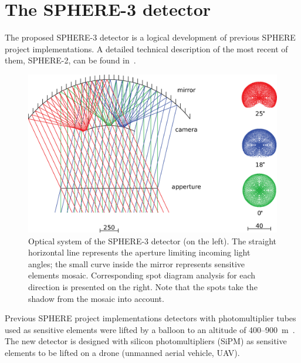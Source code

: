 \documentclass[a4paper,11pt]{article}
\begin{document}

\section{The SPHERE-3 detector}

The proposed SPHERE-3 detector is a logical development of previous SPHERE project implementations. A detailed technical description of the most recent of them, SPHERE-2, can be found in~\cite{Antonov2020}.

\begin{figure}
        \centering 
        \includegraphics[height=.35\textheight, angle=0]{Sphere3optic_combo.eps}
        \caption{Optical system of the SPHERE-3 detector (on the left). The straight horizontal line represents the aperture limiting incoming light angles; the small curve inside the mirror represents sensitive elements mosaic. Corresponding spot diagram analysis for each direction is presented on the right. Note that the spots take the shadow from the mosaic into account.}
        \label{fig:optical-system}
\end{figure}


Previous SPHERE project implementations detectors with photomultiplier tubes used as sensitive elements were lifted by a balloon to an altitude of 400--900~m~\cite{Ant15a}. The new detector is designed with silicon photomultipliers (SiPM) as sensitive elements to be lifted on a drone (unmanned aerial vehicle, UAV). 
\end{document}
